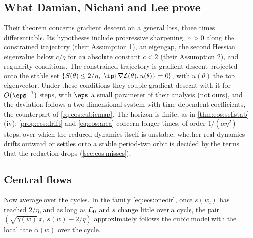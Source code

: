 \begin{refsection}
\subsection{What Damian, Nichani and Lee prove}

Their theorem concerns gradient descent on a general loss, three times differentiable. Its hypotheses include progressive sharpening, $\alpha>0$ along the constrained trajectory (their Assumption 1), an eigengap, the second Hessian eigenvalue below $c/\eta$ for an absolute constant $c<2$ (their Assumption 2), and regularity conditions. The constrained trajectory is gradient descent projected onto the stable set $\{S(\theta)\le2/\eta,\ \ip{\nabla\Loss(\theta),u(\theta)}=0\}$, with $u(\theta)$ the top eigenvector. Under these conditions they couple gradient descent with it for $O(\eps^{-1})$ steps, with $\eps$ a small parameter of their analysis (not ours), and the deviation follows a two-dimensional system with time-dependent coefficients, the counterpart of \eqref{eq:eos:cubicmap}. The horizon is finite, as in \cref{thm:eos:selfstab}(iv); \cref{prop:eos:drift} and \eqref{eq:eos:area} concern longer times, of order $1/(\alpha\eta^2)$ steps, over which the reduced dynamics itself is unstable; whether real dynamics drifts outward or settles onto a stable period-two orbit is decided by the terms that the reduction drops (\cref{sec:eos:misses}).

\subsection{Central flows}\label{sec:eos:central}

Now average over the cycles. In the family \eqref{eq:eos:onedir}, once $s(w_t)$ has reached $2/\eta$, and as long as $\mathcal{L}_0$ and $s$ change little over a cycle, the pair $(\sqrt{\gamma(w)}\,x,\ s(w)-2/\eta)$ approximately follows the cubic model with the local rate $\alpha(w)$ over the cycle.


\end{refsection}
